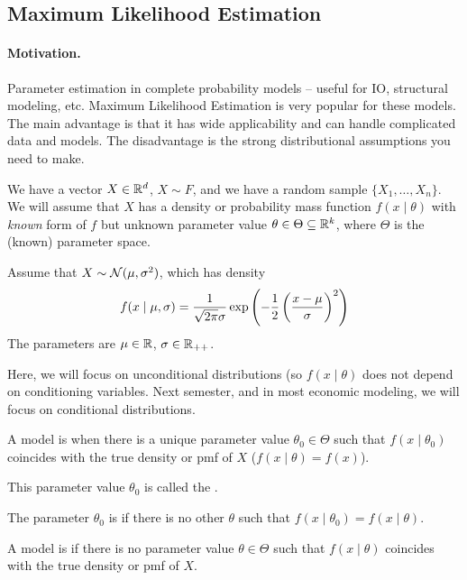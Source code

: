 \documentclass[10pt]{article}
\begin{document}
\subsection{Maximum Likelihood Estimation}

\paragraph{Motivation.} Parameter estimation in complete probability models -- useful for IO, structural modeling, etc. Maximum Likelihood Estimation is very popular for these  models. The main advantage is that it has wide applicability and can handle complicated data and models. The disadvantage is the strong distributional assumptions you need to make.

\begin{model}
	 We have a vector $X \in \mathbb{R}^d$, $X \sim F$, and we have a random sample $\{X_1,\dots,X_n\}$. We will assume that $X$ has a density or probability mass function $f(x \mid \theta)$ with \emph{known} form of $f$ but unknown parameter value $\theta \in \Theta \subseteq \mathbb{R}^k$, where $\Theta$ is the (known) parameter space.
\end{model}

\begin{example}
	Assume that $X \sim \mathcal{N}(\mu,\sigma^2)$, which has density
	\[
	f(x \mid \mu,\sigma) = \frac{1}{\sqrt{2\pi}\sigma} \exp\left( -\frac{1}{2}\left( \frac{x - \mu}{\sigma}\right)^2 \right)
	\]
	The parameters are $\mu \in \mathbb{R}$, $\sigma \in \mathbb{R}_{++}$.
	
	\begin{remark}
		Here, we will focus on unconditional distributions (so $f(x \mid \theta)$ does not depend on conditioning variables. Next semester, and in most economic modeling, we will focus on conditional distributions.
	\end{remark}
\end{example}

\begin{definition}
	A model is  when there is a unique parameter value $\theta_0 \in \Theta$ such that $f(x \mid \theta_0)$ coincides with the true density or pmf of $X$ (\ie $f(x\mid\theta) = f(x)$).
	
	This parameter value $\theta_0$ is called the .
	
	The parameter $\theta_0$ is  if there is no other $\theta$ such that $f(x \mid \theta_0) = f(x\mid \theta)$. 
	
	A model is  if there is no parameter value $\theta \in \Theta$ such that $f(x \mid \theta)$ coincides with the true density or pmf of $X$.
\end{definition}
\end{document}
